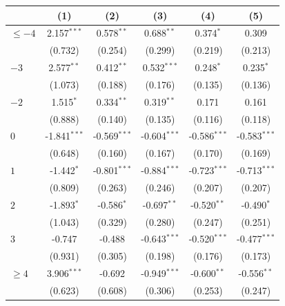 
\begingroup
\centering
\begin{tabular}{lccccc}
   \toprule
                        & (1)            & (2)            & (3)            & (4)            & (5)\\  
   \midrule 
   $\leq -4$            & 2.157$^{***}$  & 0.578$^{**}$   & 0.688$^{**}$   & 0.374$^{*}$    & 0.309\\   
                        & (0.732)        & (0.254)        & (0.299)        & (0.219)        & (0.213)\\   
   $-3$                 & 2.577$^{**}$   & 0.412$^{**}$   & 0.532$^{***}$  & 0.248$^{*}$    & 0.235$^{*}$\\   
                        & (1.073)        & (0.188)        & (0.176)        & (0.135)        & (0.136)\\   
   $-2$                 & 1.515$^{*}$    & 0.334$^{**}$   & 0.319$^{**}$   & 0.171          & 0.161\\   
                        & (0.888)        & (0.140)        & (0.135)        & (0.116)        & (0.118)\\   
   $0$                  & -1.841$^{***}$ & -0.569$^{***}$ & -0.604$^{***}$ & -0.586$^{***}$ & -0.583$^{***}$\\   
                        & (0.648)        & (0.160)        & (0.167)        & (0.170)        & (0.169)\\   
   $1$                  & -1.442$^{*}$   & -0.801$^{***}$ & -0.884$^{***}$ & -0.723$^{***}$ & -0.713$^{***}$\\   
                        & (0.809)        & (0.263)        & (0.246)        & (0.207)        & (0.207)\\   
   $2$                  & -1.893$^{*}$   & -0.586$^{*}$   & -0.697$^{**}$  & -0.520$^{**}$  & -0.490$^{*}$\\   
                        & (1.043)        & (0.329)        & (0.280)        & (0.247)        & (0.251)\\   
   $3$                  & -0.747         & -0.488         & -0.643$^{***}$ & -0.520$^{***}$ & -0.477$^{***}$\\   
                        & (0.931)        & (0.305)        & (0.198)        & (0.176)        & (0.173)\\   
   $\geq 4$             & 3.906$^{***}$  & -0.692         & -0.949$^{***}$ & -0.600$^{**}$  & -0.556$^{**}$\\   
                        & (0.623)        & (0.608)        & (0.306)        & (0.253)        & (0.247)\\   

\end{tabular}
